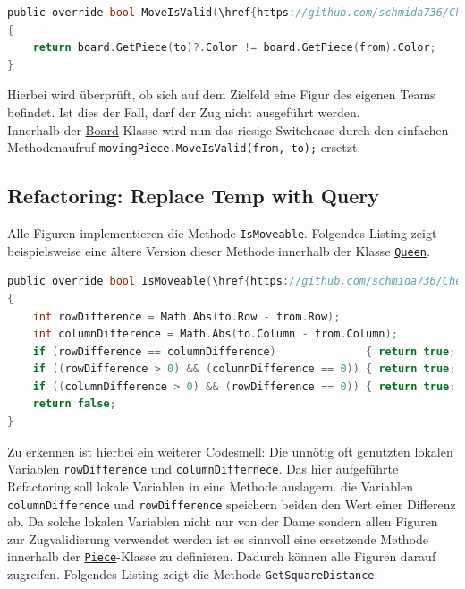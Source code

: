 \documentclass[
10pt, %
a4paper, %
oneside, %
headinclude,footinclude, %
BCOR5mm, %
]{scrartcl}
\begin{document}
\begin{onehalfspace}
\begin{lstlisting}[language=c, style=mStyle]
public override bool MoveIsValid(\href{https://github.com/schmida736/Chess-AdvancedSE/blob/main/Chess-AdvancedSE/Game\%20Elements/Square.cs}{Square} from, \href{https://github.com/schmida736/Chess-AdvancedSE/blob/main/Chess-AdvancedSE/Game\%20Elements/Square.cs}{Square} to)
{
	return board.GetPiece(to)?.Color != board.GetPiece(from).Color;
}
\end{lstlisting}

Hierbei wird überprüft, ob sich auf dem Zielfeld eine Figur des eigenen Teams befindet. Ist dies der Fall, darf der Zug nicht ausgeführt werden.\\
Innerhalb der \href{https://github.com/schmida736/Chess-AdvancedSE/blob/main/Chess-AdvancedSE/Game\%20Elements/Board.cs}{Board}-Klasse wird nun das riesige Switchcase durch den einfachen Methodenaufruf \texttt{movingPiece.MoveIsValid(from, to);} ersetzt.

\subsection{Refactoring: Replace Temp with Query}
\label{sec:replTemp}
Alle Figuren implementieren die Methode \texttt{IsMoveable}. Folgendes Listing zeigt beispielsweise eine ältere Version dieser Methode innerhalb der Klasse \texttt{\href{https://github.com/schmida736/Chess-AdvancedSE/blob/main/Chess-AdvancedSE/Game\%20Elements/Pieces/Queen.cs}{Queen}}.


\begin{lstlisting}[language=c, style=mStyle]
public override bool IsMoveable(\href{https://github.com/schmida736/Chess-AdvancedSE/blob/main/Chess-AdvancedSE/Game\%20Elements/Square.cs}{Square} from, \href{https://github.com/schmida736/Chess-AdvancedSE/blob/main/Chess-AdvancedSE/Game\%20Elements/Square.cs}{Square} to)
{
	int rowDifference = Math.Abs(to.Row - from.Row);
	int columnDifference = Math.Abs(to.Column - from.Column);
	if (rowDifference == columnDifference)              { return true; }
	if ((rowDifference > 0) && (columnDifference == 0)) { return true; }
	if ((columnDifference > 0) && (rowDifference == 0)) { return true; }
	return false;
}
\end{lstlisting}
Zu erkennen ist hierbei ein weiterer Codesmell: Die unnötig oft genutzten lokalen Variablen \texttt{rowDifference} und \texttt{columnDiffernece}. Das hier aufgeführte Refactoring soll lokale Variablen in eine Methode auslagern. die Variablen \texttt{columnDifference} und \texttt{rowDifference} speichern beiden den Wert einer Differenz ab. Da solche lokalen Variablen nicht nur von der Dame sondern allen Figuren zur Zugvalidierung verwendet werden ist es sinnvoll eine ersetzende Methode innerhalb der \texttt{\href{https://github.com/schmida736/Chess-AdvancedSE/blob/main/Chess-AdvancedSE/Game\%20Elements/Pieces/Piece.cs}{Piece}}-Klasse zu definieren. Dadurch können alle Figuren darauf zugreifen. Folgendes Listing zeigt die Methode \texttt{GetSquareDistance}:


\end{onehalfspace}
\end{document}
